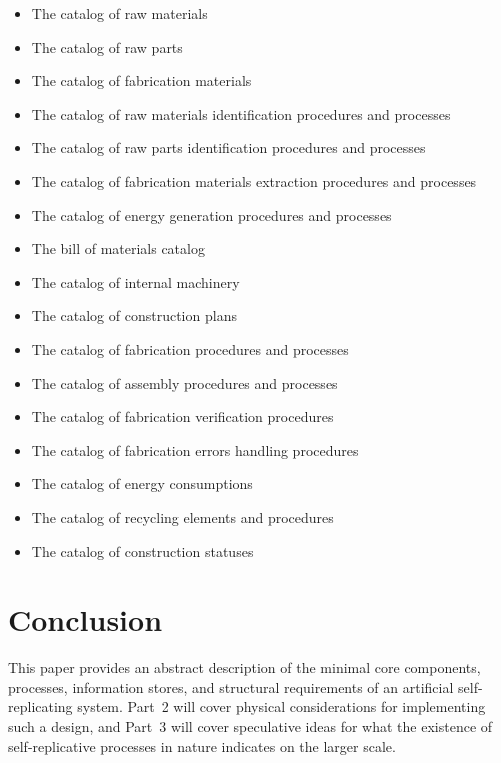 \begin{itemize}
\item The catalog of raw materials
\item The catalog of raw parts
\item The catalog of fabrication materials
\item The catalog of raw materials identification procedures and
processes
\item The catalog of raw parts identification procedures and processes
\item The catalog of fabrication materials extraction procedures and
processes
\item The catalog of energy generation procedures and processes
\item The bill of materials catalog
\item The catalog of internal machinery
\item The catalog of construction plans
\item The catalog of fabrication procedures and processes
\item The catalog of assembly procedures and processes
\item The catalog of fabrication verification procedures
\item The catalog of fabrication errors handling procedures
\item The catalog of energy consumptions
\item The catalog of recycling elements and procedures
\item The catalog of construction statuses
\end{itemize}

\section{Conclusion}

This paper provides an abstract description of the minimal core components,
processes, information stores, and structural requirements of an artificial 
self-replicating system.  Part~2 will cover physical considerations for
implementing such a design, and Part~3 will cover speculative ideas for
what the existence of self-replicative processes in nature indicates on the
larger scale.
